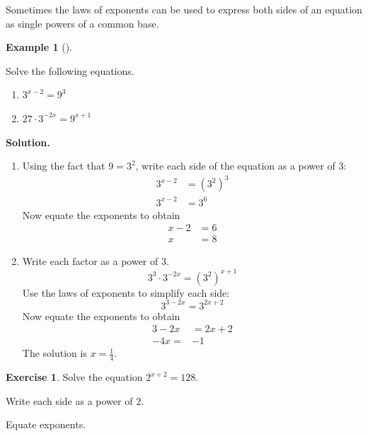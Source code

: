 \documentclass[10pt,]{book}
\theoremstyle{plain}
\theoremstyle{definition}
\theoremstyle{definition}
\theoremstyle{definition}
\newtheorem{example}[theorem]{Example}
\theoremstyle{definition}
\theoremstyle{definition}
\newtheorem{exercise}[theorem]{Exercise}
\numberwithin{equation}{section}
\newcommand{\amp}{ & }
\begin{document}
	Sometimes the laws of exponents can be used to express both sides of an equation as single powers of a common base.
%
\begin{example}[]\label{example-exponential-equations}

	Solve the following equations.
	\leavevmode%
\begin{enumerate}[label=*\alph**]
\item\hypertarget{li-676}{}\(3^{x−2} = 9^3\)\item\hypertarget{li-677}{}\( 27 \cdot 3^{−2x} = 9^{x+1}\)\end{enumerate}

%
\par\medskip\noindent%
\textbf{Solution.}\quad \leavevmode%
\begin{enumerate}[label=*\alph**]
\item\hypertarget{li-678}{}
		Using the fact that \(9 = 3^2\), write each side of the equation as a power of \(3\):
		\begin{align*}
		3^{x−2} \amp = \left(3^2\right)^3 \\
		3^{x−2} \amp = 3^6 
		\end{align*}
		Now equate the exponents to obtain
		\begin{align*}
		x − 2 \amp = 6 \\
		x  \amp = 8
		\end{align*}
	\item\hypertarget{li-679}{}
		Write each factor as a power of \(3\).
		\begin{equation*}3^3 \cdot 3^{−2x} = \left(3^2\right)^{x+1}\end{equation*}
		Use the laws of exponents to simplify each side:
		\begin{equation*}3^{3−2x} = 3^{2x+2}\end{equation*}
		Now equate the exponents to obtain
		\begin{align*}
		3 − 2x \amp = 2x + 2 \\
		−4x =\amp  −1
		\end{align*}
		The solution is \(x = \frac{1}{4}\).
	\end{enumerate}
\end{example}
\begin{exercise}\label{exercise-exponential-equation}
Solve the equation \(2^{x+2} = 128\).%

		Write each side as a power of \(2\).
\par

		Equate exponents.
\end{exercise}
\end{document}
